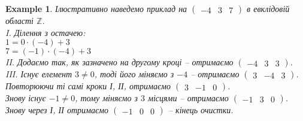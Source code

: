 \documentclass[a4paper, 10pt]{article}
\theoremstyle{theoremdd}
\theoremstyle{theoremdd}
\theoremstyle{theoremdd}
\theoremstyle{theoremdd}
\theoremstyle{theoremdd}
\newtheorem{example}[theorem]{Example}
\theoremstyle{theoremdd}
\theoremstyle{theoremdd}
\theoremstyle{theoremdd}
\theoremstyle{theoremdd}
\theoremstyle{theoremdd}
\theoremstyle{theoremdd}
\theoremstyle{theoremdd}
\theoremstyle{theoremdd}
\theoremstyle{theoremdd}
\theoremstyle{theoremdd}
\begin{document}
\begin{example}
Ілюстративно наведемо приклад на $\begin{pmatrix}
-4 & 3 & 7
\end{pmatrix}$ в евклідовій області $\mathbb{Z}$.\\
I. Ділення з остачею:\\
$1 = 0 \cdot (-4) + 3$\\
$7 = (-1) \cdot (-4) + 3$\\
II. Додаємо так, як зазначено на другому кроці -- отримаємо $\begin{pmatrix}
-4 & 3 & 3
\end{pmatrix}$.\\
III. Існує елемент $3 \neq 0$, тоді його міняємо з $-4$ -- отримаємо  $\begin{pmatrix}
3 & -4 & 3
\end{pmatrix}$.\\
Повторюючи ті самі кроки І, ІІ, отримаємо $\begin{pmatrix}
3 & -1 & 0
\end{pmatrix}$.\\
Знову існує $-1 \neq 0$, тому міняємо з $3$ місцями -- отримаємо $\begin{pmatrix}
-1 & 3 & 0
\end{pmatrix}$. Знову через І, ІІ отримаємо $\begin{pmatrix}
-1 & 0 & 0
\end{pmatrix}$ -- кінець очистки.
\end{example}
\end{document}
